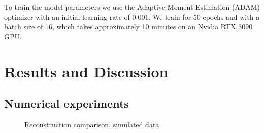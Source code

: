 \documentclass[sn-mathphys]{sn-jnl}%
\theoremstyle{thmstyleone}%
\theoremstyle{thmstyletwo}%
\theoremstyle{thmstylethree}%
\begin{document}
To train the model parameters we use the Adaptive Moment Estimation (ADAM) optimizer with an initial learning rate of 0.001.\cite{kingma2014adam} We train for 50 epochs and with a batch size of 16, which takes approximately 10 minutes on an Nvidia RTX 3090 GPU.




\section{Results and Discussion}

\subsection{Numerical experiments}



\begin{figure}%
    \centering
    \hspace*{0cm}
    \hspace*{0cm}
    \caption{Reconstruction comparison, simulated data}%
    \label{fig:sim_comparison}%
\end{figure}


\end{document}
